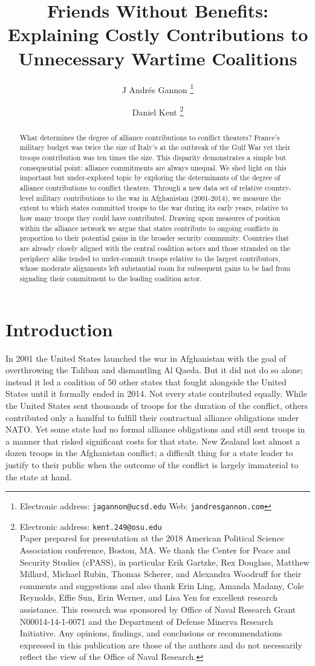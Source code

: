 \documentclass[12pt,letterpaper]{article}
\title{Friends Without Benefits: Explaining Costly Contributions to Unnecessary Wartime Coalitions}
\author{J Andr\'{e}s Gannon%
	\thanks{Electronic address: \texttt{jagannon@ucsd.edu} Web: \texttt{jandresgannon.com}}}
\affil{Department of Political Science \\ University of California, San Diego}
\author{Daniel Kent%
	\thanks{Electronic address: \texttt{kent.249@osu.edu} \\ Paper prepared for presentation at the 2018 American Political Science Association conference, Boston, MA. We thank the Center for Peace and Security Studies (cPASS), in particular Erik Gartzke, Rex Douglass, Matthew Millard, Michael Rubin, Thomas Scherer, and Alexandra Woodruff for their comments and suggestions and also thank Erin Ling, Amanda Madany, Cole Reynolds, Effie Sun, Erin Werner, and Lisa Yen for excellent research assistance. This research was sponsored by Office of Naval Research Grant N00014-14-1-0071 and the Department of Defense Minerva Research Initiative. Any opinions, findings, and conclusions or recommendations expressed in this publication are those of the authors and do not necessarily reflect the view of the Office of Naval Research.}}
\affil{Department of Political Science \\ The Ohio State University}
\begin{document}
\maketitle

\begin{abstract}
What determines the degree of alliance contributions to conflict theaters? France's military budget was twice the size of Italy's at the outbreak of the Gulf War yet their troops contribution was ten times the size. This disparity demonstrates a simple but consequential point: alliance commitments are always unequal. We shed light on this important but under-explored topic by exploring the determinants of the degree of alliance contributions to conflict theaters. Through a new data set of relative country-level military contributions to the war in Afghanistan (2001-2014), we measure the extent to which states committed troops to the war during its early years, relative to how many troops they could have contributed. Drawing upon measures of position within the alliance network we argue that states contribute to ongoing conflicts in proportion to their potential gains in the broader security community. Countries that are already closely aligned with the central coalition actors and those stranded on the periphery alike tended to under-commit troops relative to the largest contributors, whose moderate alignments left substantial room for subsequent gains to be had from signaling their commitment to the leading coalition actor.
\end{abstract}

\doublespacing
\section{Introduction}
	In 2001 the United States launched the war in Afghanistan with the goal of overthrowing the Taliban and dismantling Al Qaeda. But it did not do so alone; instead it led a coalition of 50 other states that fought alongside the United States until it formally ended in 2014. Not every state contributed equally. While the United States sent thousands of troops for the duration of the conflict, others contributed only a handful to fulfill their contractual alliance obligations under NATO. Yet some state had no formal alliance obligations and still sent troops in a manner that risked significant costs for that state. New Zealand lost almost a dozen troops in the Afghanistan conflict; a difficult thing for a state leader to justify to their public when the outcome of the conflict is largely immaterial to the state at hand.
\end{document}
